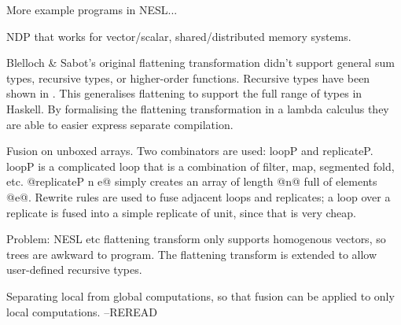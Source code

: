 More example programs in NESL...


NDP that works for vector/scalar, shared/distributed memory systems.

Blelloch \& Sabot's original flattening transformation didn't support general sum types, recursive types, or higher-order functions. Recursive types have been shown in \cite{keller1998flattening}.
This generalises flattening to support the full range of types in Haskell.
By formalising the flattening transformation in a lambda calculus they are able to easier express separate compilation.

Fusion on unboxed arrays. Two combinators are used: loopP and replicateP.
loopP is a complicated loop that is a combination of filter, map, segmented fold, etc.
@replicateP n e@ simply creates an array of length @n@ full of elements @e@.
Rewrite rules are used to fuse adjacent loops and replicates; a loop over a replicate is
fused into a simple replicate of unit, since that is very cheap.




Problem: NESL etc flattening transform only supports homogenous vectors, so trees are awkward to program.
The flattening transform is extended to allow user-defined recursive types.

Separating local from global computations, so that fusion can be applied to only local computations.
--REREAD







